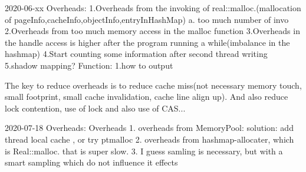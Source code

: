 2020-06-xx
Overheads:
1.Overheads from the invoking of real::malloc.(mallocation of pageInfo,cacheInfo,objectInfo,entryInHashMap)
a. too much number of invo
2.Overheads from too much memory access in the malloc function
3.Overheads in the handle access is higher after the program running a while(imbalance in the hashmap)
4.Start counting some information after second thread writing
5.shadow mapping?
Function:
1.how to output

The key to reduce overheads is to reduce cache miss(not necessary memory touch, small footprint, small cache invalidation, cache line align up).
And also reduce lock contention, use of lock and also use of CAS...


2020-07-18 Overheads:
Overheads
1. overheads from MemoryPool:
solution: add thread local cache , or try ptmalloc
2. overheads from hashmap-allocater, which is Real::malloc. that is super slow.
3. I guess samling is necessary, but with a smart sampling which do not influence it effects
